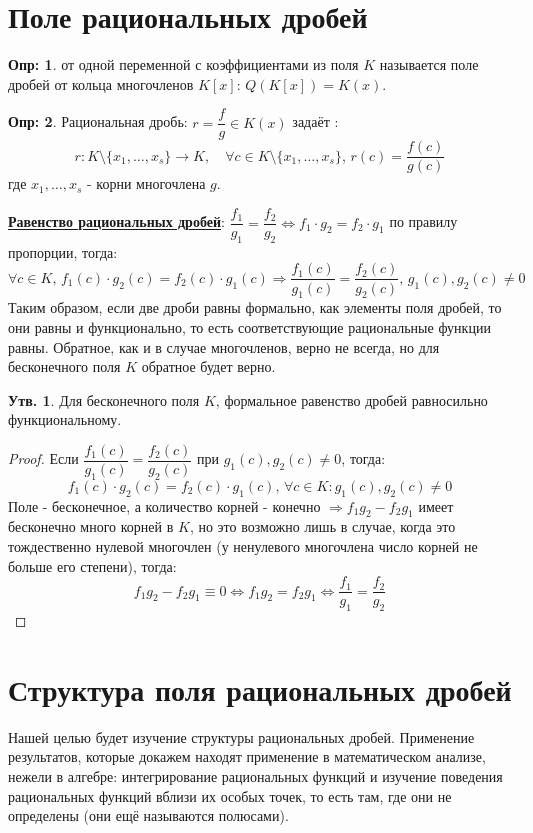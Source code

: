 \documentclass[12pt]{article}
\theoremstyle{definition}
\newtheorem{defn}{Опр:}
\newtheorem{prop}{Утв.}
\begin{document}
\section*{Поле рациональных дробей}
\begin{defn}
	 от одной переменной с коэффициентами из поля $K$ называется поле дробей от кольца многочленов $K[x]$: $Q(K[x]) = K(x)$.
\end{defn}

\begin{defn}
	Рациональная дробь: $r = \dfrac{f}{g} \in K(x)$ задаёт : 
	$$
		r\colon K \setminus \{x_1,\dotsc,x_s\} \to K, \quad \forall c \in K \setminus \{x_1,\dotsc,x_s\}, \, r(c) = \dfrac{f(c)}{g(c)}
	$$
	где $x_1,\dotsc,x_s$ - корни многочлена $g$.
\end{defn}

\textbf{\uline{Равенство рациональных дробей}}: $\dfrac{f_1}{g_1} = \dfrac{f_2}{g_2} \Leftrightarrow f_1{\cdot}g_2 = f_2{\cdot}g_1$ по правилу пропорции, тогда: 
$$
	\forall c \in  K, \, f_1(c){\cdot}g_2(c) = f_2(c){\cdot}g_1(c) \Rightarrow \dfrac{f_1(c)}{g_1(c)} = \dfrac{f_2(c)}{g_2(c)}, \, g_1(c), g_2(c) \neq 0
$$
Таким образом, если две дроби равны формально, как элементы поля дробей, то они равны и функционально, то есть соответствующие рациональные функции равны. Обратное, как и в случае многочленов, верно не всегда, но для бесконечного поля $K$ обратное будет верно.

\begin{prop}
	Для бесконечного поля $K$, формальное равенство дробей равносильно функциональному.
\end{prop}
\begin{proof}
	Если $\dfrac{f_1(c)}{g_1(c)} = \dfrac{f_2(c)}{g_2(c)}$ при $g_1(c),g_2(c) \neq 0$, тогда:
	$$
		f_1(c){\cdot}g_2(c) = f_2(c){\cdot}g_1(c), \, \forall c \in K \colon g_1(c),g_2(c) \neq 0
	$$
	Поле - бесконечное, а количество корней - конечно $\Rightarrow f_1g_2 - f_2g_1$ имеет бесконечно много корней в $K$, но это возможно лишь в случае, когда это тождественно нулевой многочлен (у ненулевого многочлена число корней не больше его степени), тогда:
	$$
		f_1g_2 - f_2g_1 \equiv 0 \Leftrightarrow f_1g_2 = f_2 g_1 \Leftrightarrow \dfrac{f_1}{g_1} = \dfrac{f_2}{g_2}		
	$$ 
\end{proof}

\newpage
\section*{Структура поля рациональных дробей}
Нашей целью будет изучение структуры рациональных дробей. Применение результатов, которые докажем находят применение в математическом анализе, нежели в алгебре: интегрирование рациональных функций и изучение поведения рациональных функций вблизи их особых точек, то есть там, где они не определены (они ещё называются полюсами).
\end{document}
